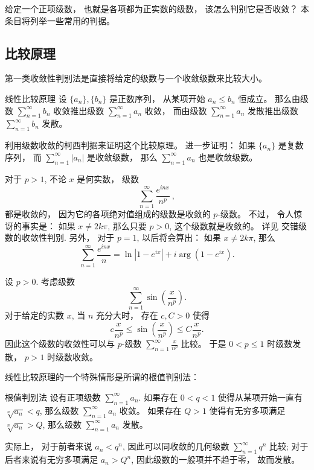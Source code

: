 

给定一个正项级数， 也就是各项都为正实数的级数， 该怎么判别它是否收敛？ 本条目将列举一些常用的判据。

\subsection{比较原理}

第一类收敛性判别法是直接将给定的级数与一个收敛级数来比较大小。 

\begin{theorem}{线性比较原理}
设 $\{a_n\},\{b_n\}$ 是正数序列， 从某项开始 $a_n\leq b_n$ 恒成立。 那么由级数 $\sum_{n=1}^\infty b_n$ 收敛推出级数 $\sum_{n=1}^\infty a_n$ 收敛， 而由级数 $\sum_{n=1}^\infty a_n$ 发散推出级数 $\sum_{n=1}^\infty b_n$ 发散。
\end{theorem}
\begin{exercise}{}
利用级数收敛的柯西判据来证明这个比较原理。 进一步证明： 如果 $\{a_n\}$ 是复数序列， 而 $\sum_{n=1}^\infty|a_n|$ 是收敛级数， 那么 $\sum_{n=1}^\infty a_n$ 也是收敛级数。
\end{exercise}

\begin{example}{}
对于 $p>1$, 不论 $x$ 是何实数， 级数
$$
\sum_{n=1}^\infty\frac{e^{inx}}{n^p}~,
$$
都是收敛的， 因为它的各项绝对值组成的级数是收敛的 $p$-级数。 不过， 令人惊讶的事实是： 如果 $x\neq 2k\pi$, 那么只要 $p>0$, 这个级数就是收敛的。 详见 交错级数的收敛性判别. 另外， 对于 $p=1$, 以后将会算出： 如果 $x\neq 2k\pi$, 那么
$$
\sum_{n=1}^\infty\frac{e^{inx}}{n}=\ln|1-e^{ix}|+i\arg(1-e^{ix}).
$$
\end{example}

\begin{example}{}
设 $p>0$. 考虑级数
$$
\sum_{n=1}^\infty\sin\left(\frac{x}{n^p}\right).
$$
对于给定的实数 $x$, 当 $n$ 充分大时， 存在 $c,C>0$ 使得
$$
c\frac{x}{n^p}\leq\sin\left(\frac{x}{n^p}\right)\leq C\frac{x}{n^p}.
$$
因此这个级数的收敛性可以与 $p$-级数 $\sum_{n=1}^\infty\frac{x}{n^p}$ 比较。 于是 $0<p\leq1$ 时级数发散， $p>1$ 时级数收敛。
\end{example}

线性比较原理的一个特殊情形是所谓的根值判别法：

\begin{theorem}{根值判别法}
设有正项级数 $\sum_{n=1}^\infty a_n$. 如果存在 $0<q<1$ 使得从某项开始一直有 $\sqrt[n]{a_n}<q$, 那么级数 $\sum_{n=1}^\infty a_n$ 收敛。 如果存在 $Q>1$ 使得有无穷多项满足 $\sqrt[n]{a_n}>Q$, 那么级数 $\sum_{n=1}^\infty a_n$ 发散。
\end{theorem}
实际上， 对于前者来说 $a_n<q^n$, 因此可以同收敛的几何级数 $\sum_{n=1}^\infty q^n$ 比较; 对于后者来说有无穷多项满足 $a_n>Q^n$, 因此级数的一般项并不趋于零， 故而发散。

